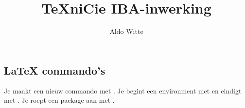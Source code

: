 \documentclass[10pt]{article}
\title{\TeX niCie IBA-inwerking}
\author{Aldo Witte}
\begin{document}
\maketitle
\subsection*{LaTeX commando's}
Je maakt een nieuw commando met . 
Je begint een environment met  en eindigt met . 
Je roept een package aan met \usepack{\placeholder}.
\end{document}
